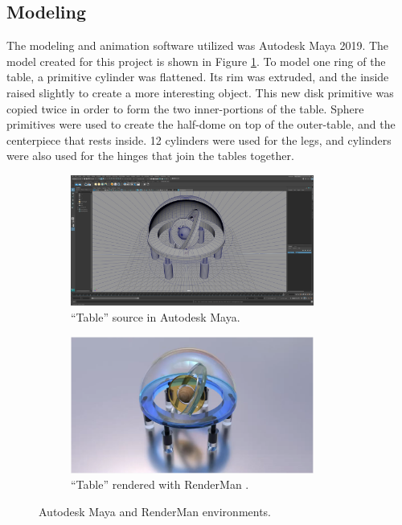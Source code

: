 \documentclass[conference]{IEEEtran}
\begin{document}
\subsection{Modeling}
\label{subsec:modeling}
The modeling and animation software utilized was Autodesk Maya 2019.
The model created for this project is shown in Figure \ref{fig:environment}.
To model one ring of the table, a primitive cylinder was flattened.
Its rim was extruded, and the inside raised slightly to create a more interesting object.
This new disk primitive was copied twice in order to form the two inner-portions of the table.
Sphere primitives were used to create the half-dome on top of the outer-table, and the centerpiece
that rests inside. 12 cylinders were used for the legs, and cylinders were also used
for the hinges that join the tables together.

\begin{figure}[h!]
\centering
\begin{subfigure}{.5\textwidth}
\begin{center}
\begin{minipage}[t]{\linewidth}
\centerline{\includegraphics[width=8cm]{project1.png}}
\caption{``Table'' source in Autodesk Maya.}
\label{fig:environment}
\end{minipage}
\end{center}
\end{subfigure}
\par\bigskip
\begin{subfigure}{.5\textwidth}
\begin{center}
\begin{minipage}[t]{\linewidth}
\centerline{\includegraphics[width=8cm]{table.png}}
\caption{``Table'' rendered with RenderMan \cite{animation}.}
\label{fig:table}
\end{minipage}
\end{center}
\end{subfigure}
\caption{Autodesk Maya and RenderMan environments.}
\label{fig:table_pair}
\end{figure}
\end{document}

